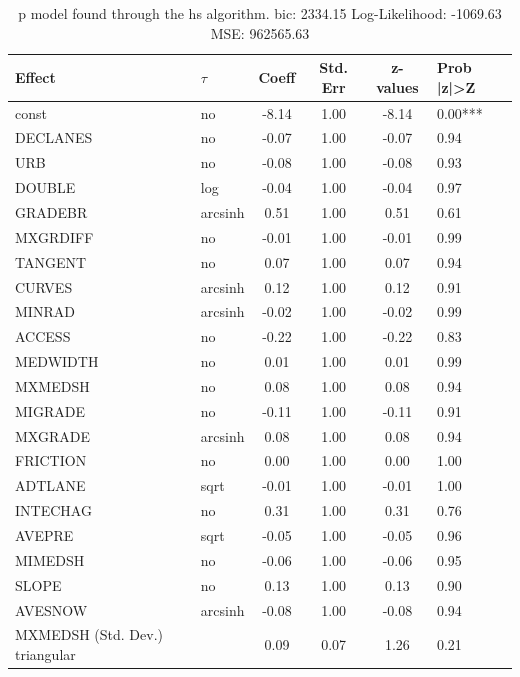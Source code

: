 \begin{table}
	\caption{p model found through the hs algorithm. bic: 2334.15 Log-Likelihood: -1069.63 MSE: 962565.63}
	\begin{center}
		\begin{tabular}{|l|l|c|c|c|l|}
			\hline
			Effect & $\tau$ & Coeff & Std. Err & z-values & Prob |z|>Z \\
			\hline
			const & no & -8.14 & 1.00 & -8.14 & 0.00*** \\
			\hline
			DECLANES & no & -0.07 & 1.00 & -0.07 & 0.94 \\
			\hline
			URB & no & -0.08 & 1.00 & -0.08 & 0.93 \\
			\hline
			DOUBLE & log & -0.04 & 1.00 & -0.04 & 0.97 \\
			\hline
			GRADEBR & arcsinh & 0.51 & 1.00 & 0.51 & 0.61 \\
			\hline
			MXGRDIFF & no & -0.01 & 1.00 & -0.01 & 0.99 \\
			\hline
			TANGENT & no & 0.07 & 1.00 & 0.07 & 0.94 \\
			\hline
			CURVES & arcsinh & 0.12 & 1.00 & 0.12 & 0.91 \\
			\hline
			MINRAD & arcsinh & -0.02 & 1.00 & -0.02 & 0.99 \\
			\hline
			ACCESS & no & -0.22 & 1.00 & -0.22 & 0.83 \\
			\hline
			MEDWIDTH & no & 0.01 & 1.00 & 0.01 & 0.99 \\
			\hline
			MXMEDSH & no & 0.08 & 1.00 & 0.08 & 0.94 \\
			\hline
			MIGRADE & no & -0.11 & 1.00 & -0.11 & 0.91 \\
			\hline
			MXGRADE & arcsinh & 0.08 & 1.00 & 0.08 & 0.94 \\
			\hline
			FRICTION & no & 0.00 & 1.00 & 0.00 & 1.00 \\
			\hline
			ADTLANE & sqrt & -0.01 & 1.00 & -0.01 & 1.00 \\
			\hline
			INTECHAG & no & 0.31 & 1.00 & 0.31 & 0.76 \\
			\hline
			AVEPRE & sqrt & -0.05 & 1.00 & -0.05 & 0.96 \\
			\hline
			MIMEDSH & no & -0.06 & 1.00 & -0.06 & 0.95 \\
			\hline
			SLOPE & no & 0.13 & 1.00 & 0.13 & 0.90 \\
			\hline
			AVESNOW & arcsinh & -0.08 & 1.00 & -0.08 & 0.94 \\
			\hline
			MXMEDSH (Std. Dev.) triangular &  & 0.09 & 0.07 & 1.26 & 0.21 \\

\end{tabular}
\end{center}
\end{table}
